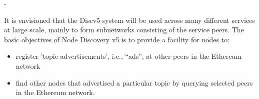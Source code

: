 -

It is envisioned that the Discv5 system will be used across many different services at large scale, mainly to form subnetworks consisting of the service peers. The basic objectives of Node Discovery v5 is to provide a facility for nodes to:
\begin{itemize}
    \item register 'topic advertisements', i.e., “ads”, at other peers in the Ethereum network
    \item find other nodes that advertised a particular topic by querying selected peers in the Ethereum network.
\end{itemize}

    
    

